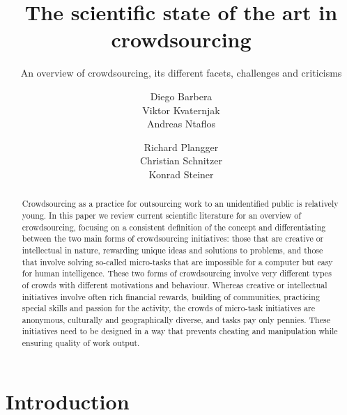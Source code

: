 \documentclass{sig-alternate}
\begin{document}
\title{The scientific state of the art in crowdsourcing}
\subtitle{An overview of crowdsourcing, its different facets, challenges and criticisms}


\author{%
	\alignauthor
	Diego Barbera\\ 
%
	\alignauthor
	Viktor Kvaternjak\\
%
	\alignauthor
	Andreas Ntaflos\\
%
	\and
%
	\alignauthor
	Richard Plangger\\ 
%
	\alignauthor
	Christian Schnitzer\\ 
%
	\alignauthor
	Konrad Steiner\\ 
	\and
}

\maketitle

\begin{abstract}
	Crowdsourcing as a practice for outsourcing work to an unidentified public
	is relatively young. In this paper we review current scientific literature
	for an overview of crowdsourcing, focusing on a consistent definition of
	the concept and differentiating between the two main forms of crowdsourcing
	initiatives: those that are creative or intellectual in nature, rewarding
	unique ideas and solutions to problems, and those that involve solving
	so-called micro-tasks that are impossible for a computer but easy for human
	intelligence. These two forms of crowdsourcing involve very different types
	of crowds with different motivations and behaviour. Whereas creative or
	intellectual initiatives involve often rich financial rewards, building of
	communities, practicing special skills and passion for the activity, the
	crowds of micro-task initiatives are anonymous, culturally and
	geographically diverse, and tasks pay only pennies.  These initiatives need
	to be designed in a way that prevents cheating and manipulation while
	ensuring quality of work output. 
\end{abstract}

\section{Introduction}
\end{document}
